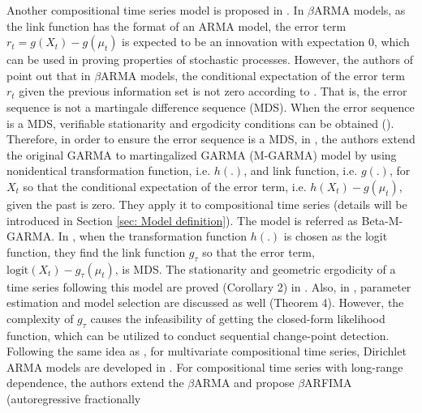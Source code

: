 \documentclass{article}
\theoremstyle{definition}
\begin{document}
Another compositional time series model is proposed in \cite{zheng2015generalized}. In $\beta$ARMA models, as the link function has the format of an ARMA model, the error term $r_t = g(X_t)-g(\mu_t)$ is expected to be an innovation with expectation 0, which can be used in proving properties of stochastic processes. However, the authors of \cite{zheng2015generalized} point out that in $\beta$ARMA models, the conditional expectation of the error term $r_t$ given the previous information set is not zero according to \cite{zheng2015generalized}. That is, the error sequence is not a martingale difference sequence (MDS). When the error sequence is a MDS, verifiable stationarity and ergodicity conditions can be obtained (\cite{zheng2015generalized}). Therefore, in order to ensure the error sequence is a MDS, in \cite{zheng2015generalized}, the authors extend the original GARMA to martingalized GARMA (M-GARMA) model by using nonidentical transformation function, i.e. $h(.)$, and link function, i.e. $g(.)$, for $X_t$ so that the conditional expectation of the error term, i.e. $h(X_t)-g(\mu_t)$, given the past is zero. They apply it to compositional time series (details will be introduced in Section \ref{sec: Model definition}). The model is referred as Beta-M-GARMA. In \cite{zheng2015generalized}, when the transformation function $h(.)$ is chosen as the logit function, they find the link function $g_{\tau}$ so that the error term, $\text{logit}(X_t)-g_{\tau}(\mu_t)$, is MDS. The stationarity and geometric ergodicity of a time series following this model are proved (Corollary 2) in \cite{zheng2015generalized}. Also, in \cite{zheng2015generalized}, parameter estimation and model selection are discussed as well (Theorem 4). However, the complexity of $g_{\tau}$ causes the infeasibility of getting the closed-form likelihood function, which can be utilized to conduct sequential change-point detection. Following the same idea as \cite{zheng2015generalized}, for multivariate compositional time series, Dirichlet ARMA models are developed in \cite{zheng2017dirichlet}. For compositional time series with long-range dependence, the authors extend the $\beta$ARMA and propose $\beta$ARFIMA (autoregressive fractionally
\end{document}
